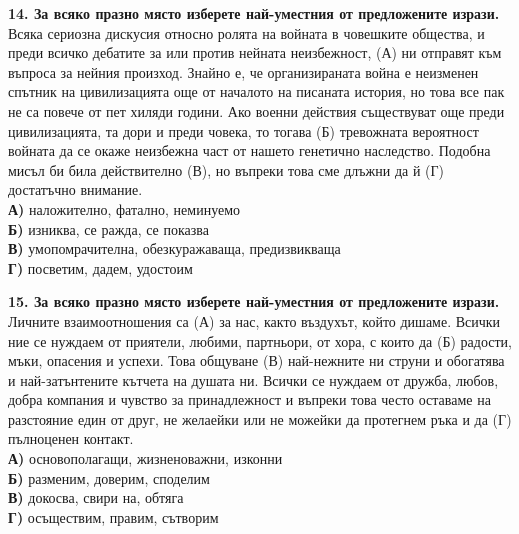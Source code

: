\documentclass[12pt,a4paper]{article}
\begin{document}
\noindent
\textbf{14. За всяко празно място изберете най-уместния от предложените изрази.} \\
\noindent
Всяка сериозна дискусия относно ролята на войната в човешките общества, и преди всичко дебатите за или против нейната неизбежност, \makebox[2cm]{\dotfill} (А) ни отправят към въпроса за нейния произход. Знайно е, че организираната война е неизменен спътник на цивилизацията още от началото на писаната история, но това все пак не са повече от пет хиляди години. Ако военни действия съществуват още преди цивилизацията, та дори и преди човека, то тогава \makebox[2cm]{\dotfill} (Б) тревожната вероятност войната да се окаже неизбежна част от нашето генетично наследство. Подобна мисъл би била действително \makebox[2cm]{\dotfill} (В), но въпреки това сме длъжни да й \makebox[2cm]{\dotfill} (Г) достатъчно внимание. \\
\noindent
\textbf{А)} наложително, фатално, неминуемо \\
\textbf{Б)} изниква, се ражда, се показва \\
\textbf{В)} умопомрачителна, обезкуражаваща, предизвикваща \\
\textbf{Г)} посветим, дадем, удостоим

\vspace{0.6cm}

\noindent
\textbf{15. За всяко празно място изберете най-уместния от предложените изрази.} \\
\noindent
Личните взаимоотношения са \makebox[2cm]{\dotfill} (А) за нас, както въздухът, който дишаме. Всички ние се нуждаем от приятели, любими, партньори, от хора, с които да \makebox[2cm]{\dotfill} (Б) радости, мъки, опасения и успехи. Това общуване \makebox[2cm]{\dotfill} (В) най-нежните ни струни и обогатява и най-затънтените кътчета на душата ни. Всички се нуждаем от дружба, любов, добра компания и чувство за принадлежност и въпреки това често оставаме на разстояние един от друг, не желаейки или не можейки да протегнем ръка и да \makebox[2cm]{\dotfill} (Г) пълноценен контакт. \\
\noindent
\textbf{А)} основополагащи, жизненоважни, изконни \\
\textbf{Б)} разменим, доверим, споделим \\
\textbf{В)} докосва, свири на, обтяга \\
\textbf{Г)} осъществим, правим, сътворим

\vspace{0.6cm}
\end{document}
